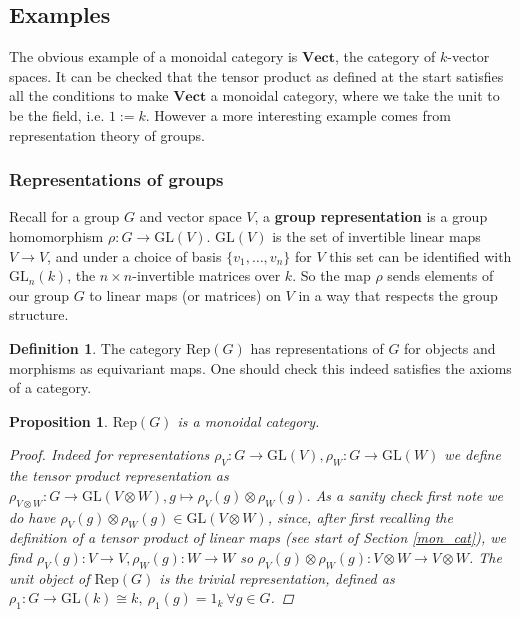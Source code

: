\documentclass[11pt]{article}
\newcommand{\bb}{\medbreak}
\newcommand{\nt}{\noindent}
\newcommand{\rt}{\xrightarrow{}}
\newcommand{\GL}{\text{GL}}
\newcommand{\Rep}{\text{Rep}}
\newcommand{\Vect}{\textbf{Vect}}
\newcommand{\define}[1]{\textbf{#1}}
\newtheorem{proposition}[lemma]{Proposition}
\theoremstyle{definition}
\newtheorem{definition}[lemma]{Definition}
\begin{document}
\subsection{Examples}
The obvious example of a monoidal category is $\Vect$, the category of $k$-vector spaces. It can be checked that the tensor product as defined at the start satisfies all the conditions to make $\Vect$ a monoidal category, where we take the unit to be the field, i.e. $1:=k$. However a more interesting example comes from representation theory of groups.\bb

\subsubsection{Representations of groups}
\nt Recall for a group $G$ and vector space $V$, a \define{group representation} is a group homomorphism $\rho:G\rt \GL(V)$. $\GL(V)$ is the set of invertible linear maps $V\rt V$, and under a choice of basis $\{v_1,\dots,v_n\}$ for $V$ this set can be identified with $\GL_n(k)$, the $n\times n$-invertible matrices over $k$. So the map $\rho$ sends elements of our group $G$ to linear maps (or matrices) on $V$ in a way that respects the group structure.\bb

\begin{definition} The category $\Rep(G)$ has representations of $G$ for objects and morphisms as equivariant maps. One should check this indeed satisfies the axioms of a category.\end{definition}

\begin{proposition} $\Rep(G)$ is a monoidal category. 
\begin{proof}
Indeed for representations $\rho_V:G\rt \GL(V), \rho_W:G\rt \GL(W)$ we define the tensor product representation as $\rho_{V\otimes W}:G\rt \GL(V\otimes W), g\mapsto \rho_V(g)\otimes \rho_W(g)$. As a sanity check first note we do have $\rho_V(g)\otimes \rho_W(g)\in \GL(V\otimes W)$, since, after first recalling the definition of a tensor product of linear maps (see start of Section \ref{mon_cat}), we find $\rho_V(g):V\rt V,\rho_W(g):W\rt W$ so $\rho_V(g)\otimes \rho_W(g):V\otimes W\rt V\otimes W$. The unit object of $\Rep(G)$ is the trivial representation, defined as $\rho_1:G\rt \GL(k)\cong k,\ \rho_1(g)=1_k\ \forall g\in G$.
\end{proof}
\end{proposition}
\end{document}
